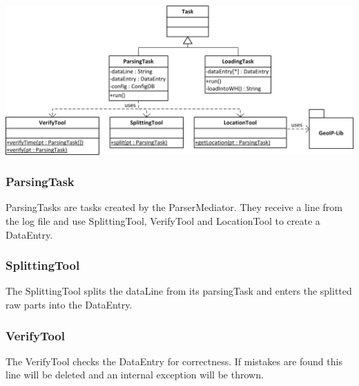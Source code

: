 


\newpage
\begin{center}
\includegraphics[width=1\linewidth]{Pictures/Parts/TaskTool.png}
\end{center}

\subsubsection*{ParsingTask}
ParsingTasks are tasks created by the ParserMediator. They receive a line from the log file and use  
SplittingTool, VerifyTool and LocationTool to create a DataEntry. 


\subsubsection*{SplittingTool}
The SplittingTool splits the dataLine from its parsingTask and enters the splitted raw parts into the DataEntry.

\subsubsection*{VerifyTool}
The VerifyTool checks the DataEntry for correctness. %
If mistakes are found this line will be deleted and an internal exception will be thrown. 


